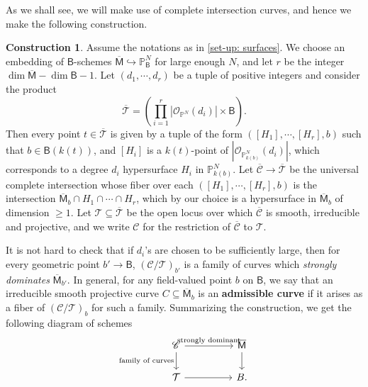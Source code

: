 \documentclass[11pt, letterpaper]{amsart}
\theoremstyle{plain}
\theoremstyle{definition}
\newtheorem{construction}[theorem]{Construction}
\newcommand{\IP}{\mathbb{P}}
\newcommand{\<}{\langle}
\renewcommand{\>}{\rangle}
\newcommand{\into}{\hookrightarrow}
\newcommand{\sO}{\mathcal{O}}
\newcommand{\sfM}{\mathsf{M}}
\newcommand{\sT}{\mathcal{T}}
\newcommand{\sfB}{\mathsf{B}}
\begin{document}
As we shall see, we will make use of complete intersection curves, and hence we make the following construction.
\begin{construction}
\label{const: strongly dominate}
Assume the notations as in \cref{set-up: surfaces}. 
    We choose an embedding of $\sfB$-schemes $\overline{\sfM} \into \IP^N_\sfB$ for large enough $N$, and let $r$ be the integer $\dim \overline{\sfM} -\dim \sfB -1$.
    Let $(d_1, \cdots, d_r)$ be a tuple of positive integers and consider the product 
     $$ \overline{\sT} = (\prod_{i = 1}^{r} |\sO_{\IP^N}(d_i)| \times \sfB). $$ 
    Then every point $t \in \overline{\sT}$ is given by a tuple of the form $([H_1], \cdots, [H_r], b)$ such that $b \in \sfB(k(t))$, and $[H_i]$ is a $k(t)$-point of $|\sO_{\IP^N_{k(b)}}(d_i)|$, which corresponds to a degree $d_i$ hypersurface $H_i$ in $\IP^N_{k(b)}$. 
    Let $\overline{\mathscr{C}} \to \overline{\sT}$ be the universal complete intersection whose fiber over each $([H_1], \cdots, [H_r], b)$ is the intersection $\overline{\sfM}_b \cap H_1 \cap \cdots \cap H_r$, which by our choice is a hypersurface in $\overline{\sfM}_b$ of dimension $\geq 1$.
    Let $\sT \subseteq \overline{\sT}$ be the open locus over which $\overline{\mathscr{C}}$ is smooth, irreducible and projective, and we write $\mathscr{C}$ for the restriction of $\overline{\mathscr{C}}$ to $\sT$. 

    
    It is not hard to check that if $d_i$'s are chosen to be sufficiently large, then for every geometric point $b' \to \sfB$, $(\mathscr{C}/\sT)_{b'}$ is a family of curves which \emph{strongly dominates} $\overline{\sfM}_{b'}$. 
    In general, for any field-valued point $b$ on $\sfB$, we say that an irreducible smooth projective curve $C \subseteq \overline{\sfM}_b$ is an \textbf{admissible curve} if it arises as a fiber of $(\mathscr{C}/\sT)_b$ for such a family. Summarizing the construction, we get the following diagram of schemes
    \begin{equation}
    	\label{eq:diagram_of_family_of_curves}
    	\begin{tikzcd}
    		\mathscr{C} \arrow[d, "\text{family of curves}"'] \arrow[rr, "\text{strongly dominant}"] && \overline{\sfM} \ar[d] \\
    		\sT \arrow[rr] && B. 		
    	\end{tikzcd}
    \end{equation}
\end{construction}
\end{document}
